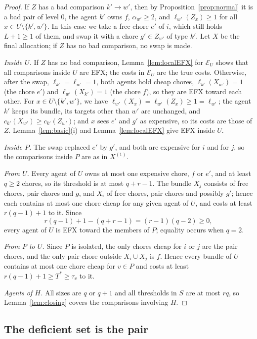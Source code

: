 \documentclass{amsart}
\numberwithin{equation}{section}
\theoremstyle{definition}
\theoremstyle{remark}
\newcommand{\cE}{\mathcal{E}}
\begin{document}
\begin{proof}
If $Z$ has a bad comparison $k'\to w'$, then by Proposition~\ref{prop:normal} it is a bad pair of level $0$, the agent $k'$ owns $f$, $\alpha_{w'}\ge2$, and $\ell_{w'}(Z_x)\ge1$ for all $x\in U\setminus\{k',w'\}$. In this case we take a free chore $e'$ of $i$, which still holds $L+1\ge1$ of them, and swap it with a chore $g'\in Z_{w'}$ of type $k'$. Let $X$ be the final allocation; if $Z$ has no bad comparison, no swap is made.

\emph{Inside $U$.} If $Z$ has no bad comparison, Lemma~\ref{lem:localEFX} for $\cE_U$ shows that all comparisons inside $U$ are EFX; the costs in $\cE_U$ are the true costs. Otherwise, after the swap, $\ell_{k'}=\ell_{w'}=1$, both agents hold cheap chores, $\ell_{k'}(X_{w'})=1$ (the chore $e'$) and $\ell_{w'}(X_{k'})=1$ (the chore $f$), so they are EFX toward each other. For $x\in U\setminus\{k',w'\}$, we have $\ell_{w'}(X_x)=\ell_{w'}(Z_x)\ge1=\ell_{w'}$; the agent $k'$ keeps its bundle, its targets other than $w'$ are unchanged, and $c_{k'}(X_{w'})\ge c_{k'}(Z_{w'})$; and $x$ sees $e'$ and $g'$ as expensive, so its costs are those of $Z$. Lemma~\ref{lem:basic}(i) and Lemma~\ref{lem:localEFX} give EFX inside $U$.

\emph{Inside $P$.} The swap replaced $e'$ by $g'$, and both are expensive for $i$ and for $j$, so the comparisons inside $P$ are as in $X^{(1)}$.

\emph{From $U$.} Every agent of $U$ owns at most one expensive chore, $f$ or $e'$, and at least $q\ge2$ chores, so its threshold is at most $q+r-1$. The bundle $X_j$ consists of free chores, pair chores and $g$, and $X_i$ of free chores, pair chores and possibly $g'$; hence each contains at most one chore cheap for any given agent of $U$, and costs at least $r(q-1)+1$ to it. Since
\[
r(q-1)+1-(q+r-1)=(r-1)(q-2)\ge0,
\]
every agent of $U$ is EFX toward the members of $P$; equality occurs when $q=2$.

\emph{From $P$ to $U$.} Since $P$ is isolated, the only chores cheap for $i$ or $j$ are the pair chores, and the only pair chore outside $X_i\cup X_j$ is $f$. Hence every bundle of $U$ contains at most one chore cheap for $v\in P$ and costs at least $r(q-1)+1\ge T^*\ge\tau_v$ to it.

\emph{Agents of $H$.} All sizes are $q$ or $q+1$ and all thresholds in $S$ are at most $rq$, so Lemma~\ref{lem:closing} covers the comparisons involving $H$.
\end{proof}

\subsection{The deficient set is the pair}
\end{document}
